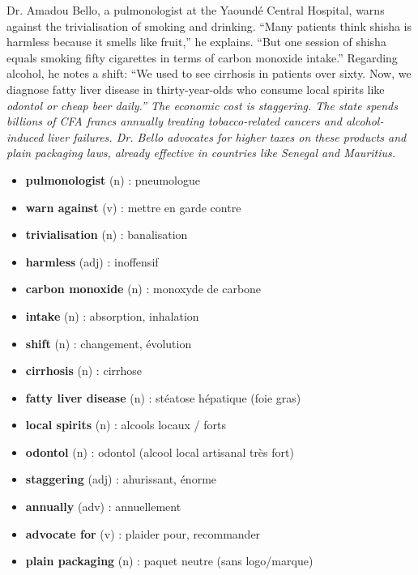 \documentclass[11pt]{article}
\newcommand{\eng}[1]{\ifmmode\text{\textit{#1}}\else\begingroup\selectlanguage{english}\itshape #1\endgroup\fi}
\begin{document}
\begin{exoresolu}
\begin{textebox}
Dr. Amadou Bello, a pulmonologist at the Yaoundé Central Hospital, warns against the trivialisation of smoking and drinking. ``Many patients think shisha is harmless because it smells like fruit,'' he explains. ``But one session of shisha equals smoking fifty cigarettes in terms of carbon monoxide intake.'' Regarding alcohol, he notes a shift: ``We used to see cirrhosis in patients over sixty. Now, we diagnose fatty liver disease in thirty-year-olds who consume local spirits like \eng{odontol} or cheap beer daily.'' The economic cost is staggering. The state spends billions of CFA francs annually treating tobacco-related cancers and alcohol-induced liver failures. Dr. Bello advocates for higher taxes on these products and plain packaging laws, already effective in countries like Senegal and Mauritius.
\end{textebox}

\end{exoresolu}

\begin{aretenir}
\begin{itemize}
    \item \textbf{pulmonologist} (n) : pneumologue
    \item \textbf{warn against} (v) : mettre en garde contre
    \item \textbf{trivialisation} (n) : banalisation
    \item \textbf{harmless} (adj) : inoffensif
    \item \textbf{carbon monoxide} (n) : monoxyde de carbone
    \item \textbf{intake} (n) : absorption, inhalation
    \item \textbf{shift} (n) : changement, évolution
    \item \textbf{cirrhosis} (n) : cirrhose
    \item \textbf{fatty liver disease} (n) : stéatose hépatique (foie gras)
    \item \textbf{local spirits} (n) : alcools locaux / forts
    \item \textbf{odontol} (n) : odontol (alcool local artisanal très fort)
    \item \textbf{staggering} (adj) : ahurissant, énorme
    \item \textbf{annually} (adv) : annuellement
    \item \textbf{advocate for} (v) : plaider pour, recommander
    \item \textbf{plain packaging} (n) : paquet neutre (sans logo/marque)
\end{itemize}
\end{aretenir}
\end{document}
